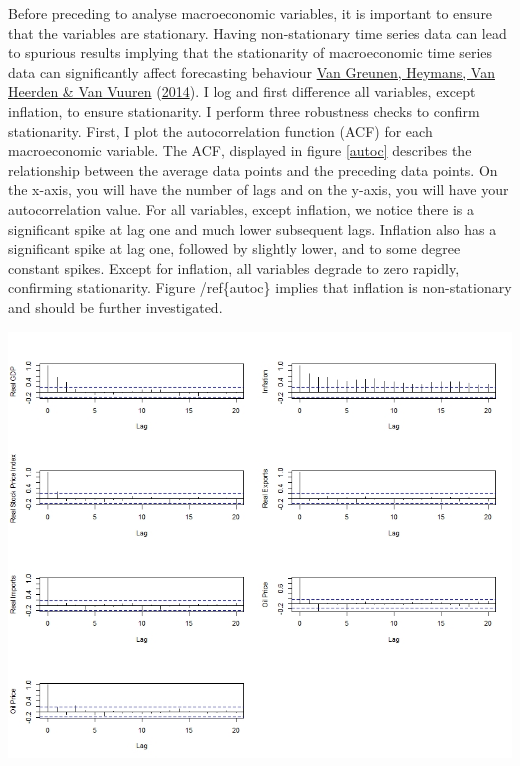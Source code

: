 \documentclass[11pt,preprint, authoryear]{elsarticle}
\let\origfigure\figure
\let\endorigfigure\endfigure
\renewenvironment{figure}[1][2] {
    \expandafter\origfigure\expandafter[H]
} {
    \endorigfigure
}
\numberwithin{equation}{section}
\numberwithin{figure}{section}
\numberwithin{table}{section}
\begin{document}
Before preceding to analyse macroeconomic variables, it is important to
ensure that the variables are stationary. Having non-stationary time
series data can lead to spurious results implying that the stationarity
of macroeconomic time series data can significantly affect forecasting
behaviour \protect\hyperlink{ref-van}{Van Greunen, Heymans, Van Heerden
\& Van Vuuren} (\protect\hyperlink{ref-van}{2014}). I log and first
difference all variables, except inflation, to ensure stationarity. I
perform three robustness checks to confirm stationarity. First, I plot
the autocorrelation function (ACF) for each macroeconomic variable. The
ACF, displayed in figure \ref{autoc} describes the relationship between
the average data points and the preceding data points. On the x-axis,
you will have the number of lags and on the y-axis, you will have your
autocorrelation value. For all variables, except inflation, we notice
there is a significant spike at lag one and much lower subsequent lags.
Inflation also has a significant spike at lag one, followed by slightly
lower, and to some degree constant spikes. Except for inflation, all
variables degrade to zero rapidly, confirming stationarity. Figure
/ref\{autoc\} implies that inflation is non-stationary and should be
further investigated.

\begin{figure}[h]
\centering
\includegraphics[width=\linewidth]{station.jpg}
\caption{Autocorrelation Function Analysis}
\label{autoc}
\end{figure}
\end{document}
